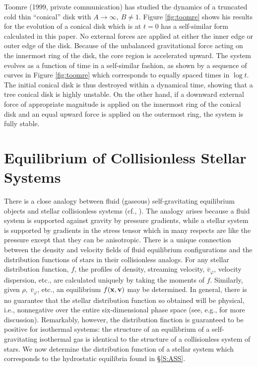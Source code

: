 Toomre (1999, private communication) has studied the dynamics of a truncated 
cold thin ``conical'' disk with $A\to\infty,\ B\not=1$. Figure \ref{fig:toomre}
shows his results for the evolution of a conical disk which is at $t=0$ has a 
self-similar form calculated in this paper. No external forces are applied at 
either the inner edge or outer edge of the disk. Because of the unbalanced 
gravitational force acting on the innermost ring of the disk, the core region 
is accelerated upward. The system evolves as a function of time in a 
self-similar fashion, as shown by a sequence of curves in Figure 
\ref{fig:toomre} which corresponds to equally spaced times in $\log t$.
The initial conical disk is thus destroyed within a dynamical time, showing
that a tree conical disk is highly unstable. On the other hand, if a
downward external force of appropriate magnitude is applied on the innermost 
ring of the conical disk and an equal upward force is applied on the 
outermost ring, the system is fully stable.


\section{Equilibrium of Collisionless Stellar Systems \label{S:PDF} }

There is a close analogy between fluid (gaseous) self-gravitating equilibrium
objects and stellar collisionless systems (cf., \cite{BT}). 
The analogy arises because a fluid system is supported against gravity by 
pressure gradients, while a stellar system is supported by gradients in the 
stress tensor which in many respects are like the pressure except that they 
can be anisotropic. There is a unique connection between the density and
velocity fields of 
fluid equilibrium configurations and the distribution functions of
stars in their collisionless analogs. For any stellar distribution function,
$f$, the profiles of density, streaming velocity, $\bar v_\varphi$, velocity 
dispersion, etc., are calculated uniquely by taking the moments of $f$. 
Similarly, given $\rho,\ \bar v_\varphi$, etc., an equilibrium $f({\bf x,v})$ 
may be determined. In general, there is no guarantee that the stellar 
distribution function so obtained will be physical, i.e., nonnegative over the 
entire six-dimensional phase space (see, e.g., \cite{BT} for more 
discussion). Remarkably, however, the distribution finction is guaranteed
to be positive for isothermal systems: the structure of an equilibrium of a
self-gravitating isothermal gas is identical to the structure of a
collisionless system of stars. We now determine the distribution function 
of a stellar system which corresponds to the hydrostatic equilibria found 
in \S \ref{S:ASS}.

